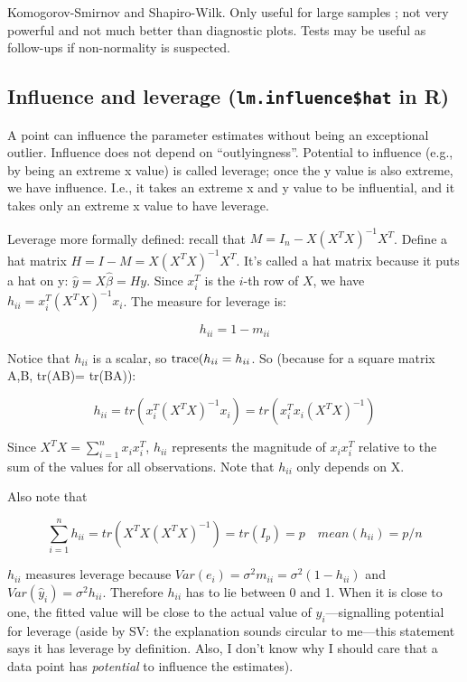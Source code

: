 Komogorov-Smirnov and Shapiro-Wilk. Only useful for large samples ; not very powerful and not much better than diagnostic plots. Tests may be useful as follow-ups if non-normality is suspected.

\subsection{Influence and leverage (\texttt{lm.influence\$hat} in R)}

A point can influence the parameter estimates without being an exceptional outlier. Influence does not depend on ``outlyingness''. Potential to influence (e.g., by being an extreme x value) is called leverage; once the y value is also extreme, we have influence. I.e., it takes an extreme x and y value to be influential, and it takes only an extreme x value to have leverage.

Leverage more formally defined: recall that $M = I_n -  X (X^T X)^{-1} X^T$. Define a hat matrix $H=I-M=X (X^T X)^{-1} X^T$. It's called a hat matrix because it puts a hat on y: $\hat{y} = X \hat{\beta} = Hy$.
Since $x_i^T$  is the $i$-th row of $X$, we have $h_{ii} = x_i^T (X^T X)^{-1}x_i$. The measure for leverage is:

\begin{equation}
h_{ii} = 1 - m_{ii}
\end{equation}

Notice that $h_{ii}$ is a scalar, so $\hbox{trace}(h_{ii}=h_{ii}$.
So (because for a square matrix A,B, tr(AB)= tr(BA)):

\begin{equation}
h_{ii} = tr(x_i^T (X^T X)^{-1}x_i)=tr(x_i^T x_i (X^T X)^{-1})
\end{equation}

Since $X^T X = \sum_{i=1}^n x_i x_i^T$, $h_{ii}$ represents the magnitude of $ x_i x_i^T$ relative to the sum of the values for all observations. Note that $h_{ii}$ only depends on X. 

Also note that

\begin{equation}
\sum_{i=1}^n h_{ii} = tr(X^T X (X^T X)^{-1}) = tr(I_p)=p \quad mean(h_{ii})=p/n
\end{equation}

$h_{ii}$ measures leverage because $Var(e_i)=\sigma^2 m_{ii} = \sigma^2(1-h_{ii})$ and $Var(\hat{y}_i) = \sigma^2 h_{ii}$. Therefore $h_{ii}$ has to lie between 0 and 1. When it is close to one, the fitted value will be close to the actual value of $y_i$---signalling potential for leverage (aside by SV: the explanation sounds circular to me---this statement says it has leverage by definition. Also, I don't know why I should care that a data point has \textit{potential} to influence the estimates).  

